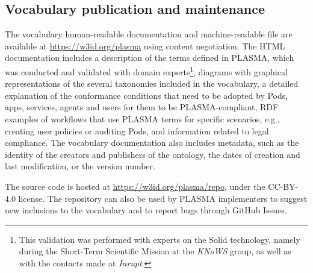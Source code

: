 

\subsection{Vocabulary publication and maintenance}
\label{sec:plasma_publication}

The vocabulary human-readable documentation and machine-readable file are available at \url{https://w3id.org/plasma} using content negotiation.
The HTML documentation includes a description of the terms defined in PLASMA, which was conducted and validated with domain experts\footnote{This validation was performed with experts on the Solid technology, namely during the Short-Term Scientific Mission at the \textit{KNoWS} group, as well as with the contacts made at \textit{Inrupt}.}, diagrams with graphical representations of the several taxonomies included in the vocabulary, a detailed explanation of the conformance conditions that need to be adopted by Pods, apps, services, agents and users for them to be PLASMA-compliant, RDF examples of workflows that use PLASMA terms for specific scenarios, e.g., creating user policies or auditing Pods, and information related to legal compliance.
The vocabulary documentation also includes metadata, such as the identity of the creators and publishers of the ontology, the dates of creation and last modification, or the version number.

The source code is hosted at \url{https://w3id.org/plasma/repo}, under the CC-BY-4.0 license.
The repository can also be used by PLASMA implementers to suggest new inclusions to the vocabulary and to report bugs through GitHub Issues.